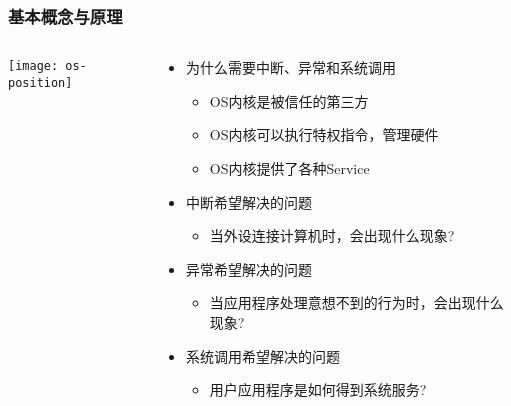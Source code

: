 \begin{frame}[plain]
	\frametitle{基本概念与原理}
	
	\begin{columns}
		
		\begin{column}{0.4\textwidth}
			\centering
			\texttt{[image: os-position]}
		\end{column}
		
	\begin{column}{0.6\textwidth}
		
    \begin{itemize}
		\item 为什么需要中断、异常和系统调用 \pause
		\begin{itemize}
			\item OS内核是被信任的第三方
			\item OS内核可以执行特权指令，管理硬件
			\item OS内核提供了各种Service
		\end{itemize}   \pause
		\item 中断希望解决的问题
		\begin{itemize}
			\item 当外设连接计算机时，会出现什么现象?
		\end{itemize}  \pause
		\item 异常希望解决的问题
		\begin{itemize}
			\item 当应用程序处理意想不到的行为时，会出现什么现象?
		\end{itemize} \pause
		\item 系统调用希望解决的问题
		\begin{itemize}
			\item 用户应用程序是如何得到系统服务?
		\end{itemize}
	\end{itemize}		
	
	\end{column}
		
	\end{columns}
	
\end{frame}


